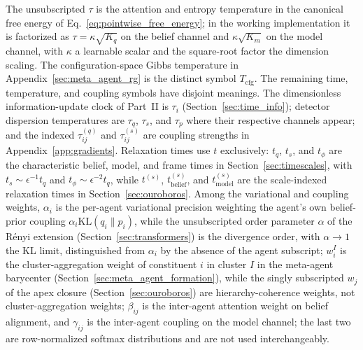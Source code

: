 \documentclass[11pt]{article}
\begin{document}
The unsubscripted $\tau$ is the attention and entropy temperature in the canonical free energy of Eq.~\eqref{eq:pointwise_free_energy}; in the working implementation it is factorized as $\tau = \kappa\sqrt{K_q}$ on the belief channel and $\kappa\sqrt{K_m}$ on the model channel, with $\kappa$ a learnable scalar and the square-root factor the dimension scaling. The configuration-space Gibbs temperature in Appendix~\ref{sec:meta_agent_rg} is the distinct symbol $T_{\mathrm{cfg}}$. The remaining time, temperature, and coupling symbols have disjoint meanings. The dimensionless information-update clock of Part~II is $\tau_i$ (Section~\ref{sec:time_info}); detector dispersion temperatures are $\tau_q$, $\tau_s$, and $\tau_p$ where their respective channels appear; and the indexed $\tau^{(q)}_{ij}$ and $\tau^{(s)}_{ij}$ are coupling strengths in Appendix~\ref{app:gradients}. Relaxation times use $t$ exclusively: $t_q$, $t_s$, and $t_\phi$ are the characteristic belief, model, and frame times in Section~\ref{sec:timescales}, with $t_s \sim \epsilon^{-1}t_q$ and $t_\phi \sim \epsilon^{-2}t_q$, while $t^{(s)}$, $t_{\mathrm{belief}}^{(s)}$, and $t_{\mathrm{model}}^{(s)}$ are the scale-indexed relaxation times in Section~\ref{sec:ouroboros}. Among the variational and coupling weights, $\alpha_i$ is the per-agent variational precision weighting the agent's own belief-prior coupling $\alpha_i\mathrm{KL}(q_i \| p_i)$, while the unsubscripted order parameter $\alpha$ of the R\'enyi extension (Section~\ref{sec:transformers}) is the divergence order, with $\alpha \to 1$ the KL limit, distinguished from $\alpha_i$ by the absence of the agent subscript; $w_i^I$ is the cluster-aggregation weight of constituent $i$ in cluster $I$ in the meta-agent barycenter (Section~\ref{sec:meta_agent_formation}), while the singly subscripted $w_j$ of the apex closure (Section~\ref{sec:ouroboros}) are hierarchy-coherence weights, not cluster-aggregation weights; $\beta_{ij}$ is the inter-agent attention weight on belief alignment, and $\gamma_{ij}$ is the inter-agent coupling on the model channel; the last two are row-normalized softmax distributions and are not used interchangeably.



\end{document}
